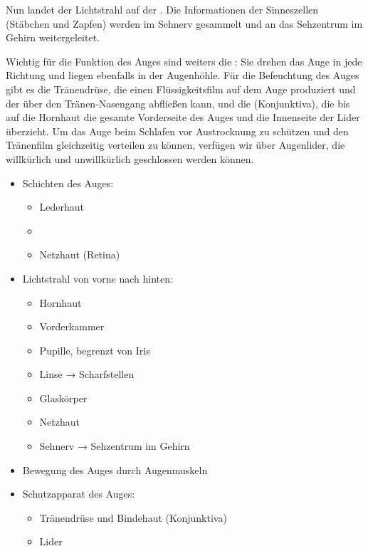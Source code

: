 {Nun landet der Lichtstrahl auf der . Die
Informationen der Sinneszellen (Stäbchen und Zapfen) werden
im Sehnerv gesammelt und an das Sehzentrum im Gehirn
weitergeleitet.

Wichtig für die Funktion des Auges sind weiters die
: Sie drehen das Auge in jede Richtung und
liegen ebenfalls in der Augenhöhle. Für die Befeuchtung des
Auges gibt es die Tränendrüse, die einen Flüssigkeitsfilm
auf dem Auge produziert und der über den Tränen-Nasengang
abfließen kann, und die  (Konjunktiva), die bis
auf die Hornhaut die gesamte Vorderseite des Auges und die
Innenseite der Lider überzieht. Um das Auge beim Schlafen
vor Austrocknung zu schützen und den Tränenfilm gleichzeitig
verteilen zu können, verfügen wir über Augenlider, die
willkürlich und unwillkürlich geschlossen werden können.
}{%
\begin{itemize}
  \item Schichten des Auges:
  \begin{itemize}
    \item Lederhaut 
    \item {}
    \item Netzhaut (Retina)
  \end{itemize}
  \item Lichtstrahl von vorne nach hinten:
  \begin{itemize}
    \item Hornhaut 
    \item Vorderkammer
    \item Pupille, begrenzt von Iris
    \item Linse → Scharfstellen
    \item Glaskörper
    \item Netzhaut
    \item Sehnerv → Sehzentrum im Gehirn
  \end{itemize}
  \item Bewegung des Auges durch Augenmuskeln
  \item Schutzapparat des Auges:
  \begin{itemize}
    \item Tränendrüse und Bindehaut (Konjunktiva)
    \item Lider
  \end{itemize}
\end{itemize}
}{}{}{}



\clearpage



